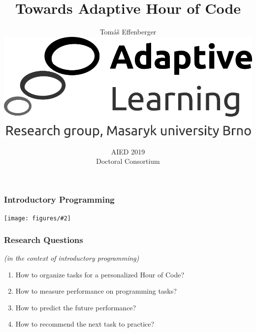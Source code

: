 \documentclass[bigger]{beamer}
\title{Towards Adaptive Hour of Code}
\author{Tom\'a\v{s} Effenberger\\[4mm]
\includegraphics[width=.3\linewidth]{figures/al-logo}\\[6mm]
}
\date{AIED 2019\\Doctoral Consortium}
\newcommand{\img}[2]{
  \begin{center}
    \texttt{[image: figures/\#2]}
  \end{center}
}
\begin{document}
\frame{\titlepage}

\begin{frame}
  \frametitle{Introductory Programming}


  \img{0.6}{robomission-on-yellow-to-left}

\end{frame}


\begin{frame}
  \frametitle{Research Questions}

  \emph{(in the context of introductory programming)}
  \begin{enumerate}
  \item How to organize tasks for a personalized Hour of Code?  %

  \item How to measure performance on programming tasks?

  \item How to predict the future performance?

  \item How to recommend the next task to practice?
  \end{enumerate}
\end{frame}
\end{document}
